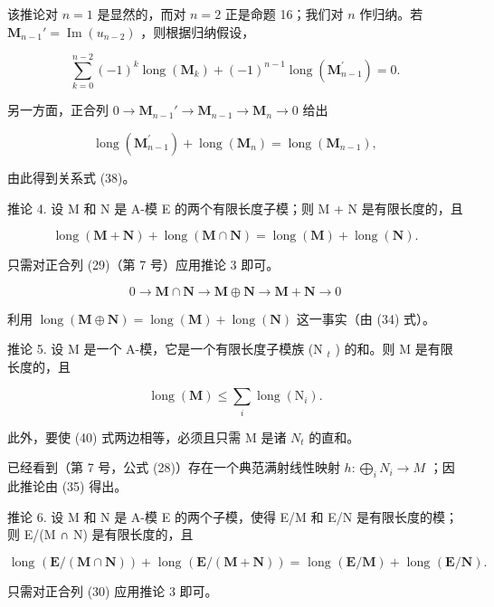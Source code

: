 该推论对 \(n = 1\) 是显然的，而对 \(n = 2\) 正是命题 16；我们对 \(n\) 作归纳。若 \(\mathbf{M}_{n-1}' = \operatorname{Im}(u_{n-2})\) ，则根据归纳假设，

\[
\sum_ {k = 0} ^ {n - 2} (- 1) ^ {k} \operatorname{long} (\mathbf {M} _ {k}) + (- 1) ^ {n - 1} \operatorname{long} (\mathbf {M} _ {n - 1} ^ {\prime}) = 0.
\]

另一方面，正合列 \(0 \to \mathbf{M}_{n-1}' \to \mathbf{M}_{n-1} \to \mathbf{M}_n \to 0\) 给出

\[
\operatorname{long} \left(\mathbf {M} _ {n - 1} ^ {\prime}\right) + \operatorname{long} \left(\mathbf {M} _ {n}\right) = \operatorname{long} \left(\mathbf {M} _ {n - 1}\right),
\]

由此得到关系式 (38)。

推论 4. 设 M 和 N 是 A-模 E 的两个有限长度子模；则 M + N 是有限长度的，且

\[
\operatorname{long} (\mathbf {M} + \mathbf {N}) + \operatorname{long} (\mathbf {M} \cap \mathbf {N}) = \operatorname{long} (\mathbf {M}) + \operatorname{long} (\mathbf {N}).\tag{39}
\]

只需对正合列 (29)（第 7 号）应用推论 3 即可。

\[
0 \rightarrow \mathbf {M} \cap \mathbf {N} \rightarrow \mathbf {M} \oplus \mathbf {N} \rightarrow \mathbf {M} + \mathbf {N} \rightarrow 0
\]

利用 \(\operatorname{long}(\mathbf{M} \oplus \mathbf{N}) = \operatorname{long}(\mathbf{M}) + \operatorname{long}(\mathbf{N})\) 这一事实（由 (34) 式）。

推论 5. 设 M 是一个 A-模，它是一个有限长度子模族 (N \(_{t}\) ) 的和。则 M 是有限长度的，且

\[
\operatorname{long} (\mathbf {M}) \leqslant \sum_ {i} \operatorname{long} \left(\mathrm{N} _ {i}\right).\tag{40}
\]

此外，要使 (40) 式两边相等，必须且只需 M 是诸 \(N_{t}\) 的直和。

已经看到（第 7 号，公式 (28)）存在一个典范满射线性映射 \(h \colon \bigoplus_{i} N_{i} \to M\) ；因此推论由 (35) 得出。

推论 6. 设 M 和 N 是 A-模 E 的两个子模，使得 E/M 和 E/N 是有限长度的模；则 E/(M ∩ N) 是有限长度的，且

\[
\text { long } (\mathbf {E} / (\mathbf {M} \cap \mathbf {N})) + \text { long } (\mathbf {E} / (\mathbf {M} + \mathbf {N})) = \text { long } (\mathbf {E} / \mathbf {M}) + \text { long } (\mathbf {E} / \mathbf {N}). \tag {41}
\]

只需对正合列 (30) 应用推论 3 即可。

